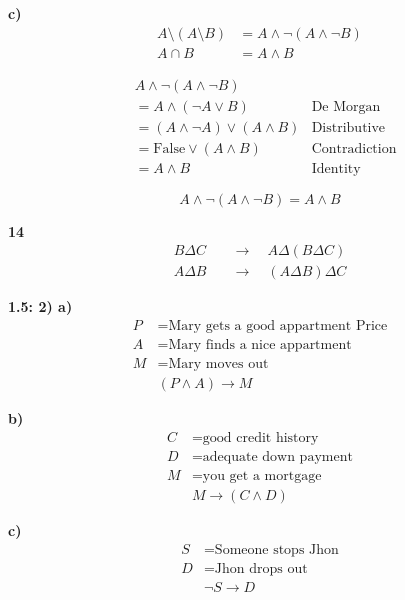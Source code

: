 \documentclass[12pt]{exam}
\begin{document}
\textbf{c)}
\begin{align*}
A \setminus (A \setminus B) &= A \land \neg (A \land \neg B) \\
A \cap B &= A \land B
\end{align*}

\begin{align*}
& A \land \neg (A \land \neg B) & \\
&= A \land (\neg A \lor B) & \text{De Morgan} \\
&= (A \land \neg A) \lor (A \land B) & \text{Distributive} \\
&= \text{False} \lor (A \land B) & \text{Contradiction} \\
&= A \land B & \text{Identity}
\end{align*}

\begin{equation*}
A \land \neg (A \land \neg B) = A \land B
\end{equation*}

\newpage

\textbf{14}
\begin{align*}
B \Delta C \quad &\to \quad A \Delta (B \Delta C) \\
A \Delta B \quad &\to \quad (A \Delta B) \Delta C
\end{align*}

\vspace{1.5em}

\textbf{1.5: 2) a)}
\begin{align*}
P &= \text{Mary gets a good appartment Price} \\
A &= \text{Mary finds a nice appartment} \\
M &= \text{Mary moves out} \\
&(P \land A) \to M
\end{align*}

\textbf{b)}
\begin{align*}
C &= \text{good credit history} \\
D &= \text{adequate down payment} \\
M &= \text{you get a mortgage} \\
&M \to (C \land D)
\end{align*}

\textbf{c)}
\begin{align*}
S &= \text{Someone stops Jhon} \\
D &= \text{Jhon drops out} \\
&\neg S \to D
\end{align*}
\end{document}
